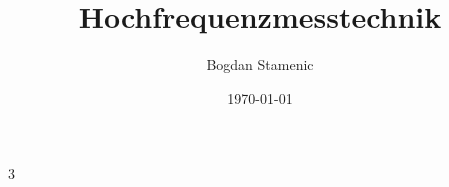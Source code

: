 

\newcommand{\FormelsammlungTitel}{Hochfrequenzmesstechnik}
\newcommand{\FormelsammlungAutor}{Bogdan Stamenic}
\setcounter{tocdepth}{2} %


	\title{\FormelsammlungTitel}
	\author{\FormelsammlungAutor}
	\date{\today}
	\begin{multicols}{3}
        {\small%
			\maketitle
			\tableofcontents
        
        
        
        }
	\end{multicols}

